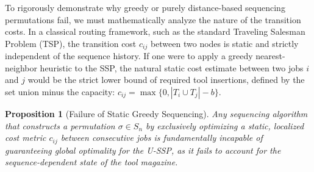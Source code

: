 \documentclass[11pt, a4paper]{book}
\newtheorem{proposition}[theorem]{Proposition}
\begin{document}
	To rigorously demonstrate why greedy or purely distance-based sequencing permutations fail, we must mathematically analyze the nature of the transition costs. In a classical routing framework, such as the standard Traveling Salesman Problem (TSP), the transition cost $c_{ij}$ between two nodes is static and strictly independent of the sequence history. If one were to apply a greedy nearest-neighbor heuristic to the SSP, the natural static cost estimate between two jobs $i$ and $j$ would be the strict lower bound of required tool insertions, defined by the set union minus the capacity: $c_{ij} = \max\{0, |T_i \cup T_j| - b\}$.
	
	\begin{proposition}[Failure of Static Greedy Sequencing]
		Any sequencing algorithm that constructs a permutation $\sigma \in S_n$ by exclusively optimizing a static, localized cost metric $c_{ij}$ between consecutive jobs is fundamentally incapable of guaranteeing global optimality for the U-SSP, as it fails to account for the sequence-dependent state of the tool magazine.
	\end{proposition}
	
\end{document}
